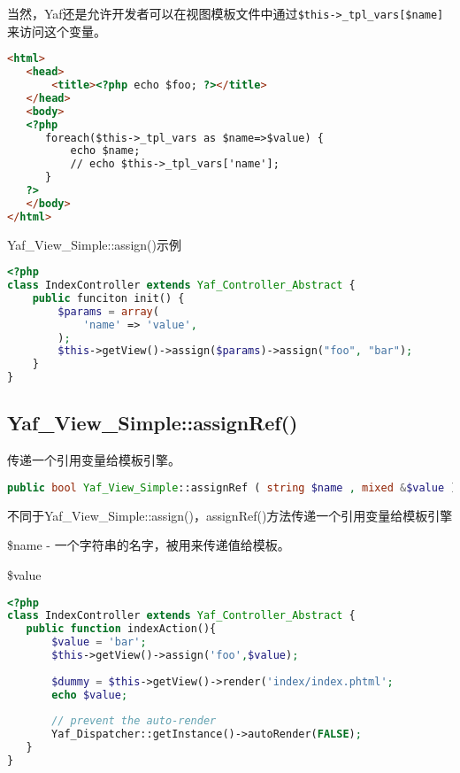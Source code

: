 当然，Yaf还是允许开发者可以在视图模板文件中通过\texttt{\$this->\_tpl\_vars[\$name]}来访问这个变量。


\begin{lstlisting}[language=HTML]
<html>
   <head>
       <title><?php echo $foo; ?></title>
   </head>
   <body>
   <?php
      foreach($this->_tpl_vars as $name=>$value) {
          echo $name; 
          // echo $this->_tpl_vars['name'];
      }
   ?>
   </body>
</html>
\end{lstlisting}

\begin{example}
Yaf\_View\_Simple::assign()示例
\begin{lstlisting}[language=PHP]
<?php
class IndexController extends Yaf_Controller_Abstract {
    public funciton init() {
        $params = array(
            'name' => 'value',
        );
        $this->getView()->assign($params)->assign("foo", "bar");
    }
}
\end{lstlisting}
\end{example}

\subsection{Yaf\_View\_Simple::assignRef()}

传递一个引用变量给模板引擎。

\begin{lstlisting}[language=PHP]
public bool Yaf_View_Simple::assignRef ( string $name , mixed &$value )
\end{lstlisting}

不同于Yaf\_View\_Simple::assign()，assignRef()方法传递一个引用变量给模板引擎


\begin{compactitem}
\item \$name - 一个字符串的名字，被用来传递值给模板。
\item \$value
\end{compactitem}



\begin{lstlisting}[language=PHP]
<?php
class IndexController extends Yaf_Controller_Abstract {
   public function indexAction(){
       $value = 'bar';
       $this->getView()->assign('foo',$value);
       
       $dummy = $this->getView()->render('index/index.phtml';
       echo $value;
       
       // prevent the auto-render
       Yaf_Dispatcher::getInstance()->autoRender(FALSE);
   }
}
\end{lstlisting}



